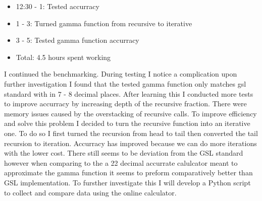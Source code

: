 \documentclass[12pt,hyperref]{labbook}
\begin{document}
\begin{itemize}
    \item 12:30 - 1: Tested accurracy
    \item 1 - 3: Turned gamma function from recursive to iterative
    \item 3 - 5: Tested gamma function accurracy
    \item Total: 4.5 hours spent working
\end{itemize}
I continued the benchmarking. During testing I notice a complication upon further investigation I found that the tested gamma function only matches gsl standard with in 7 - 8 decimal places. After learning this I conducted more tests to improve accurracy by increasing depth of the recursive fraction. There were memory issues caused by the overstacking of recursive calls. To improve efficiency and solve this problem I decided to turn the recursive function into an iterative one. To
do so I first turned the recursion from head to tail then converted the tail recursion to iteration. Accurracy has improved because we can do more iterations with the lower cost. There still seems to be deviation from the GSL standard however when comparing to the a 22 decimal accurrate calulcator meant to approximate the gamma function it seems to preform comparatively better than GSL implementation. To fursther investigate this I will develop a Python script to collect and compare data using the online calculator.
\end{document}
